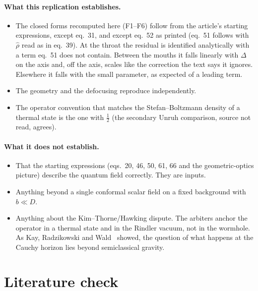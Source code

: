 \paragraph{What this replication establishes.}
\begin{itemize}
\item The closed forms recomputed here (F1--F6) follow from the article's starting expressions, except eq.~31, and except eq.~52 as printed (eq.~51 follows with $\hat\rho$ read as in eq.~39). At the throat the residual is identified analytically with a term eq.~51 does not contain. Between the mouths it falls linearly with $\Delta$ on the axis and, off the axis, scales like the correction the text says it ignores. Elsewhere it falls with the small parameter, as expected of a leading term.
\item The geometry and the defocusing reproduce independently.
\item The operator convention that matches the Stefan--Boltzmann density of a thermal state is the one with $\tfrac12$ (the secondary Unruh comparison, source not read, agrees).
\end{itemize}

\paragraph{What it does not establish.}
\begin{itemize}
\item That the starting expressions (eqs.~20, 46, 50, 61, 66 and the geometric-optics picture) describe the quantum field correctly. They are inputs.
\item Anything beyond a single conformal scalar field on a fixed background with $b \ll D$.
\item Anything about the Kim--Thorne/Hawking dispute. The arbiters anchor the operator in a thermal state and in the Rindler vacuum, not in the wormhole. As Kay, Radzikowski and Wald~\cite{krw1997} showed, the question of what happens at the Cauchy horizon lies beyond semiclassical gravity.
\end{itemize}

\section{Literature check}
\label{sec:literature}

